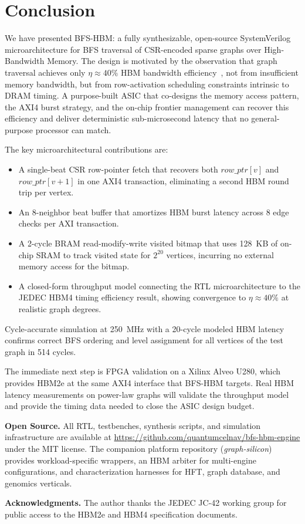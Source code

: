 \section{Conclusion}

We have presented BFS-HBM: a fully synthesizable, open-source SystemVerilog
microarchitecture for BFS traversal of CSR-encoded sparse graphs over
High-Bandwidth Memory. The design is motivated by the observation that graph
traversal achieves only $\eta \approx 40\%$ HBM bandwidth efficiency~\cite{fritz2026rmwwall},
not from insufficient memory bandwidth, but from row-activation scheduling
constraints intrinsic to DRAM timing. A purpose-built ASIC that co-designs the
memory access pattern, the AXI4 burst strategy, and the on-chip frontier management
can recover this efficiency and deliver deterministic sub-microsecond latency that
no general-purpose processor can match.

The key microarchitectural contributions are:
\begin{itemize}[leftmargin=*,itemsep=2pt]
\item A single-beat CSR row-pointer fetch that recovers both $\mathit{row\_ptr}[v]$
  and $\mathit{row\_ptr}[v+1]$ in one AXI4 transaction, eliminating a second HBM
  round trip per vertex.
\item An 8-neighbor beat buffer that amortizes HBM burst latency across 8 edge
  checks per AXI transaction.
\item A 2-cycle BRAM read-modify-write visited bitmap that uses 128~KB of on-chip
  SRAM to track visited state for $2^{20}$ vertices, incurring no external memory
  access for the bitmap.
\item A closed-form throughput model connecting the RTL microarchitecture to the
  JEDEC HBM4 timing efficiency result, showing convergence to $\eta \approx 40\%$
  at realistic graph degrees.
\end{itemize}

Cycle-accurate simulation at 250~MHz with a 20-cycle modeled HBM latency confirms
correct BFS ordering and level assignment for all vertices of the test graph in 514 cycles.

The immediate next step is FPGA validation on a Xilinx Alveo U280, which provides
HBM2e at the same AXI4 interface that BFS-HBM targets. Real HBM latency measurements
on power-law graphs will validate the throughput model and provide the timing data
needed to close the ASIC design budget.

\vspace{6pt}
\noindent\textbf{Open Source.}
All RTL, testbenches, synthesis scripts, and simulation infrastructure are available at
\url{https://github.com/quantumcelnav/bfs-hbm-engine} under the MIT license.
The companion platform repository (\textit{graph-silicon}) provides workload-specific
wrappers, an HBM arbiter for multi-engine configurations, and characterization
harnesses for HFT, graph database, and genomics verticals.

\vspace{6pt}
\noindent\textbf{Acknowledgments.} The author thanks the JEDEC JC-42 working group
for public access to the HBM2e and HBM4 specification documents.
